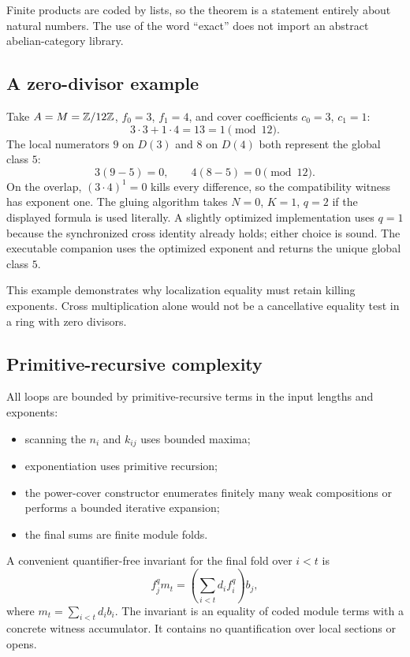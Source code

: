 Finite products are coded by lists, so the theorem is a statement entirely about natural numbers.
The use of the word ``exact'' does not import an abstract abelian-category library.

\subsection{A zero-divisor example}

Take $A=M=\mathbb Z/12\mathbb Z$, $f_0=3$, $f_1=4$, and cover coefficients $c_0=3$, $c_1=1$:
\[
                    3\cdot3+1\cdot4=13=1\pmod {12}.
\]
The local numerators $9$ on $D(3)$ and $8$ on $D(4)$ both represent the global class $5$:
\[
                  3(9-5)=0,\qquad 4(8-5)=0\pmod {12}.
\]
On the overlap, $(3\cdot4)^1=0$ kills every difference, so the compatibility witness has exponent
one.  The gluing algorithm takes $N=0$, $K=1$, $q=2$ if the displayed formula is used literally.
A slightly optimized implementation uses $q=1$ because the synchronized cross identity already
holds; either choice is sound.  The executable companion uses the optimized exponent and returns the
unique global class $5$.

This example demonstrates why localization equality must retain killing exponents.  Cross
multiplication alone would not be a cancellative equality test in a ring with zero divisors.

\subsection{Primitive-recursive complexity}

All loops are bounded by primitive-recursive terms in the input lengths and exponents:

\begin{itemize}
\item scanning the $n_i$ and $k_{ij}$ uses bounded maxima;
\item exponentiation uses primitive recursion;
\item the power-cover constructor enumerates finitely many weak compositions or performs a bounded
      iterative expansion;
\item the final sums are finite module folds.
\end{itemize}

A convenient quantifier-free invariant for the final fold over $i<t$ is
\[
 f_j^q m_t=\left(\sum_{i<t}d_i f_i^q\right)b_j,
\]
where $m_t=\sum_{i<t}d_i b_i$.  The invariant is an equality of coded module terms with a concrete
witness accumulator.  It contains no quantification over local sections or opens.

